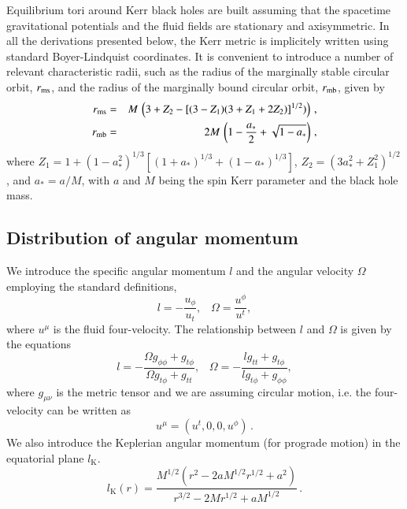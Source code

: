 \documentclass{aa}
\begin{document}
Equilibrium tori around Kerr black holes are built assuming that the spacetime gravitational potentials and the fluid fields are stationary and axisymmetric. In all the derivations presented below, the Kerr metric is implicitely written using standard Boyer-Lindquist coordinates. It is convenient to introduce a number of relevant characteristic radii, such as the radius
of the marginally stable circular orbit, $r_{\rm ms}$, and the radius of the marginally bound circular orbit, $r_{\rm mb}$, given by
\begin{eqnarray}
r_{\rm ms} &=& M\,\left(3+Z_2-\left[(3-Z_1)(3+Z_1+2Z_2)\right]^{1/2})\right)\,,
\\
r_{\rm mb} &=& 2M\,\left(  1-\frac{a_*}{2} + \sqrt{1-a_*} \right)\,,
\end{eqnarray}
where $Z_1=1+(1-a_*^2)^{1/3}[(1+a_*)^{1/3}+(1-a_*)^{1/3}]$, $Z_2=(3a_*^2+Z_1^2)^{1/2}$, and $a_*=a/M$, with $a$ and $M$ being the spin Kerr parameter and the black hole mass.

\subsection{Distribution of angular momentum}

We introduce the specific angular momentum $l$ and the angular velocity $\Omega$ employing the standard definitions,
\begin{equation}
l = - \frac{u_{\phi}}{u_t}, \;\;\; \Omega = \frac{u^{\phi}}{u^t},
\end{equation}
where $u^{\mu}$ is the fluid four-velocity.
%
%
The relationship between $l$ and $\Omega$ is given by the equations
\begin{equation}
l = - \frac{\Omega g_{\phi\phi} + g_{t\phi}}{\Omega g_{t\phi} + g_{tt}}, \;\;\; \Omega = - \frac{l g_{tt} + g_{t\phi}}{l g_{t\phi} + g_{\phi\phi}},
\end{equation}
where $g_{\mu\nu}$ is the metric tensor and we are assuming circular motion, i.e. the four-velocity can be written as
\begin{equation}
u^{\mu} = (u^t, 0, 0, u^{\phi})\,.
\end{equation}
We also introduce the Keplerian angular momentum (for prograde motion) in the equatorial plane $l_{\mathrm{K}}$. 
\begin{equation}\label{eq:kepler}
l_{\mathrm{K}}(r) = \frac{M^{1/2}(r^{2}-2aM^{1/2}r^{1/2}+a^{2})}{r^{3/2}-2Mr^{1/2}+aM^{1/2}}\,.
\end{equation}
\end{document}
